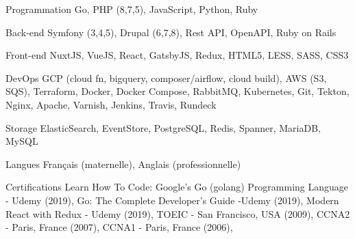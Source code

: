

\begin{cvskills}

  \cvskill
    {Programmation} %
    {Go, PHP (8,7,5), JavaScript, Python, Ruby} %

  \cvskill
    {Back-end} %
    {Symfony (3,4,5), Drupal (6,7,8), Rest API, OpenAPI, Ruby on Rails} %

  \cvskill
    {Front-end} %
    {NuxtJS, VueJS, React, GatsbyJS, Redux, HTML5, LESS, SASS, CSS3} %

  \cvskill
    {DevOps} %
    {GCP (cloud fn, bigquery, composer/airflow, cloud build), AWS (S3, SQS), Terraform, Docker, Docker Compose, RabbitMQ, Kubernetes, Git, Tekton, Nginx, Apache, Varnish, Jenkins, Travis, Rundeck} %

  \cvskill
    {Storage} %
    {ElasticSearch, EventStore, PostgreSQL, Redis, Spanner, MariaDB, MySQL} %

  \cvskill
    {Langues} %
    {Français (maternelle), Anglais (professionnelle)} %

  \cvskill
  {Certifications} %
  {
  Learn How To Code: Google’s Go (golang) Programming Language - Udemy (2019),
  Go: The Complete Developer’s Guide -Udemy (2019),
  Modern React with Redux - Udemy (2019),
  TOEIC - San Francisco, USA (2009),
  CCNA2 - Paris, France (2007),
  CCNA1 - Paris, France (2006),
  } %

\end{cvskills}
